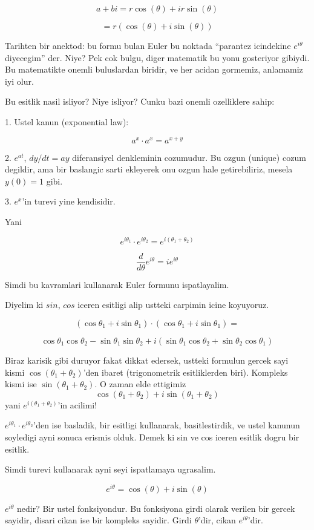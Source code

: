 \documentclass[12pt,fleqn]{article}\usepackage{../common}
\begin{document}
\[ a+bi = r\cos(\theta) + ir\sin(\theta) \]

\[ = r (\cos(\theta) + i\sin(\theta)) \]

Tarihten bir anektod: bu formu bulan Euler bu noktada ``parantez icindekine
$e^{i\theta}$ diyecegim'' der. Niye? Pek cok bulgu, diger matematik bu yonu
gosteriyor gibiydi. Bu matematikte onemli buluslardan biridir, ve her
acidan gormemiz, anlamamiz iyi olur. 

Bu esitlik nasil isliyor? Niye isliyor? Cunku bazi onemli ozelliklere sahip:

1. Ustel kanun (exponential law):

\[ a^x \cdot a^x = a^{x+y} \]

2. $e^{at}$, $dy/dt = ay$ diferansiyel denkleminin cozumudur. Bu ozgun
(unique) cozum degildir, ama bir baslangic sarti ekleyerek onu ozgun hale
getirebiliriz, mesela $y(0)=1$ gibi.

3. $e^x$'in turevi yine kendisidir. 

Yani

\[ e^{i\theta_1} \cdot  e^{i\theta_2} = e^{i(\theta_1 + \theta_2)}\]

\[ \frac{d}{d\theta} e^{i\theta} = i e^{i\theta} \]

Simdi bu kavramlari kullanarak Euler formunu ispatlayalim. 

Diyelim ki $sin$, $cos$ iceren esitligi alip ustteki carpimin icine
koyuyoruz.

\[ 
(\cos\theta_1 + i\sin\theta_1) \cdot (\cos\theta_1 + i\sin\theta_1) =
\] 

\[  
\cos\theta_1\cos\theta_2 - \sin\theta_1\sin\theta_2 +
i(\sin\theta_1\cos\theta_2 + \sin\theta_2\cos\theta_1 )
\] 

Biraz karisik gibi duruyor fakat dikkat edersek, ustteki formulun gercek
sayi kismi $\cos(\theta_1 + \theta_2)$'den ibaret (trigonometrik esitliklerden biri). 
Kompleks kismi ise $\sin(\theta_1 + \theta_2)$. O zaman elde ettigimiz \[
\cos(\theta_1+\theta_2) + i\sin(\theta_1+\theta_2) \] 
yani $e^{i(\theta_1+\theta_2)}$'in acilimi!

$e^{i\theta_1} \cdot e^{i\theta_2}$'den ise basladik, bir esitligi kullanarak, basitlestirdik, 
ve ustel kanunun soyledigi ayni sonuca erismis olduk. Demek ki sin ve cos 
iceren esitlik dogru bir esitlik.

Simdi turevi kullanarak ayni seyi ispatlamaya ugrasalim. 

\[ e^{i\theta} = \cos(\theta) + i\sin(\theta) \]

$e^{i\theta}$ nedir? Bir ustel fonksiyondur. Bu fonksiyona girdi olarak
verilen bir gercek sayidir, disari cikan ise bir kompleks sayidir. Girdi
$\theta$'dir, cikan $e^{i\theta}$'dir.
\end{document}
